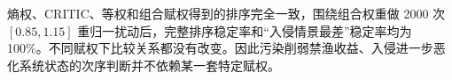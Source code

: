 熵权、CRITIC、等权和组合赋权得到的排序完全一致，围绕组合权重做 2000 次 $[0.85,1.15]$ 重归一扰动后，完整排序稳定率和“入侵情景最差”稳定率均为 100\%。不同赋权下比较关系都没有改变。因此污染削弱禁渔收益、入侵进一步恶化系统状态的次序判断并不依赖某一套特定赋权。
